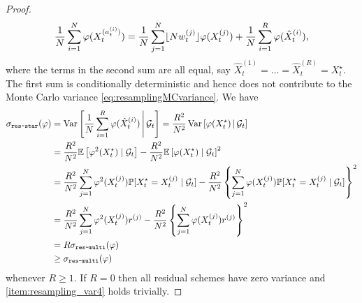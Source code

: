 \begin{proof}
\begin{equation*}
\frac{1}{N} \sum_{i=1}^N \varphi( X_t^{(a_t^{(i)})} )
= \frac{1}{N} \sum_{j=1}^N \flnw[j] \varphi (X_t^{(j)})
        + \frac{1}{N} \sum_{i=1}^R \varphi (\hat{X}_t^{(i)}) ,
\end{equation*}
where the terms in the second sum are all equal, say $\hat{X}_t^{(1)} = \dots = \hat{X}_t^{(R)} = X_t^\star$.
The first sum is conditionally deterministic and hence does not contribute to the Monte Carlo variance \eqref{eq:resamplingMCvariance}.
We have
\begin{align*}
\sigma_{\texttt{res-star}}(\varphi)
&= \V\left[ \frac{1}{N} \sum_{i=1}^R \varphi (\hat{X}_t^{(i)}) \midd \mathcal{G}_t \right] 
= \frac{R^2}{N^2} \V\left[ \varphi (X_t^\star) \midd \mathcal{G}_t \right] \\
&= \frac{R^2}{N^2} \E\left[ \varphi^2( X_t^\star) \mid \mathcal{G}_t \right]
        - \frac{R^2}{N^2} \E\left[ \varphi( X_t^\star) \mid \mathcal{G}_t \right]^2 \\
&= \frac{R^2}{N^2} \sum_{j=1}^N \varphi^2(X_t^{(j)}) 
        \Prob[ X_t^\star = X_t^{(j)} \mid \mathcal{G}_t ]
        - \frac{R^2}{N^2} \left\{ \sum_{j=1}^N \varphi(X_t^{(j)}) 
        \Prob[ X_t^\star = X_t^{(j)} \mid \mathcal{G}_t ] \right\}^2 \\
&= \frac{R^2}{N^2} \sum_{j=1}^N \varphi^2(X_t^{(j)}) r^{(j)}
        - \frac{R^2}{N^2} \left\{ \sum_{j=1}^N \varphi(X_t^{(j)}) r^{(j)} \right\}^2 \\
&= R \sigma_{\texttt{res-multi}}(\varphi) \\
&\geq \sigma_{\texttt{res-multi}}(\varphi) 
\end{align*}
whenever $R\geq 1$. 
If $R=0$ then all residual schemes have zero variance and \ref{item:resampling_var4} holds trivially.
\end{proof}


